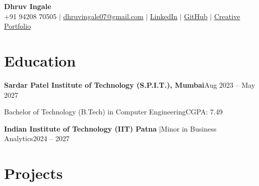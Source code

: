 \documentclass[a4paper,10pt]{article}
\newcommand{\sep}{\unskip\hspace{0.5em}$|$\hspace{0.5em}\ignorespaces}
\newlength{\entryindent}\setlength{\entryindent}{10pt}
\newcommand{\entry}[2]{\hspace*{\entryindent}#1\hfill #2\par}
\begin{document}

\begin{center}
    {\Huge\textbf{Dhruv Ingale}}\\[5pt]
    \small
    +91 94208 70505 \sep
    \href{mailto:dhruvingale07@gmail.com}{dhruvingale07@gmail.com} \sep
    \href{https://linkedin.com/in/dhruv-ingale-42637b322}{LinkedIn} \sep
    \href{https://github.com/dhruubb}{GitHub} \sep
    \href{https://bydhruv.vercel.app/}{Creative Portfolio}
\end{center}


\section*{Education}
\entry{\textbf{Sardar Patel Institute of Technology (S.P.I.T.), Mumbai}}{Aug 2023 -- May 2027}
\entry{Bachelor of Technology (B.Tech) in Computer Engineering}{CGPA: 7.49}
\vspace{4pt}
\entry{\textbf{Indian Institute of Technology (IIT) Patna} \sep Minor in Business Analytics}{2024 -- 2027}


\section*{Projects}
\end{document}
